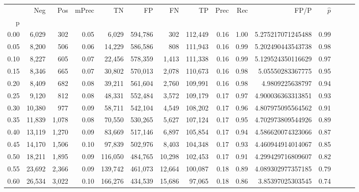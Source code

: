 \begin{tabular}{rrrrrrrrrrrrrrr}
\toprule
{} &     Neg &     Pos & mPrec &       TN &       FP &       FN &       TP &  Prec &   Rec &                 FP/P & $\hat{p}$ \\
p    &         &         &       &          &          &          &          &       &       &                      &           \\
\midrule
0.00 &   6,029 &     302 &  0.05 &    6,029 &  594,786 &      302 &  112,449 &  0.16 &  1.00 &    5.275217071245488 &      0.99 \\
0.05 &   8,200 &     506 &  0.06 &   14,229 &  586,586 &      808 &  111,943 &  0.16 &  0.99 &    5.202490443543738 &      0.98 \\
0.10 &   8,227 &     605 &  0.07 &   22,456 &  578,359 &    1,413 &  111,338 &  0.16 &  0.99 &    5.129524350116629 &      0.97 \\
0.15 &   8,346 &     665 &  0.07 &   30,802 &  570,013 &    2,078 &  110,673 &  0.16 &  0.98 &     5.05550283367775 &      0.95 \\
0.20 &   8,409 &     682 &  0.08 &   39,211 &  561,604 &    2,760 &  109,991 &  0.16 &  0.98 &      4.9809225638797 &      0.94 \\
0.25 &   9,120 &     812 &  0.08 &   48,331 &  552,484 &    3,572 &  109,179 &  0.17 &  0.97 &    4.900036363313851 &      0.93 \\
0.30 &  10,380 &     977 &  0.09 &   58,711 &  542,104 &    4,549 &  108,202 &  0.17 &  0.96 &    4.807975095564562 &      0.91 \\
0.35 &  11,839 &   1,078 &  0.08 &   70,550 &  530,265 &    5,627 &  107,124 &  0.17 &  0.95 &    4.702973809544926 &      0.89 \\
0.40 &  13,119 &   1,270 &  0.09 &   83,669 &  517,146 &    6,897 &  105,854 &  0.17 &  0.94 &    4.586620074323066 &      0.87 \\
0.45 &  14,170 &   1,506 &  0.10 &   97,839 &  502,976 &    8,403 &  104,348 &  0.17 &  0.93 &    4.460944914014067 &      0.85 \\
0.50 &  18,211 &   1,895 &  0.09 &  116,050 &  484,765 &   10,298 &  102,453 &  0.17 &  0.91 &    4.299429716809607 &      0.82 \\
0.55 &  23,692 &   2,366 &  0.09 &  139,742 &  461,073 &   12,664 &  100,087 &  0.18 &  0.89 &    4.089302977357185 &      0.79 \\
0.60 &  26,534 &   3,022 &  0.10 &  166,276 &  434,539 &   15,686 &   97,065 &  0.18 &  0.86 &     3.85397025303545 &      0.74 \\

\end{tabular}
